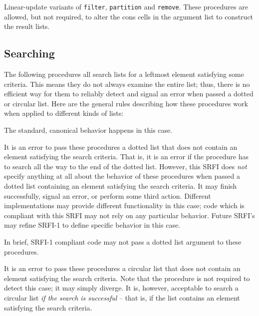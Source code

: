 \begin{entry}{%
  }

  Linear-update
  variants of \texttt{filter}, \texttt{partition} and
  \texttt{remove}. These procedures are allowed, but not required, to
  alter the cons cells in the argument list to construct the result
  lists.
\end{entry}

\subsection{{Searching}}\label{Searching}


The following procedures all search lists for a leftmost element
satisfying some criteria. This means they do not always examine the
entire list; thus, there is no efficient way for them to reliably detect
and signal an error when passed a dotted or circular list. Here are the
general rules describing how these procedures work when applied to
different kinds of lists:

\begin{description}
\tightlist
\item[ Proper lists: ]
The standard, canonical behavior happens in this case.
\item[ Dotted lists: ]
It is an error to pass these procedures a dotted list that does not
contain an element satisfying the search criteria. That is, it is an
error if the procedure has to search all the way to the end of the
dotted list. However, this SRFI does \emph{not} specify anything at all
about the behavior of these procedures when passed a dotted list
containing an element satisfying the search criteria. It may finish
successfully, signal an error, or perform some third action. Different
implementations may provide different functionality in this case; code
which is compliant with this SRFI may not rely on any particular
behavior. Future SRFI's may refine SRFI-1 to define specific behavior in
this case.

In brief, SRFI-1 compliant code may not pass a dotted list argument to
these procedures.
\item[ Circular lists: ]
It is an error to pass these procedures a circular list that does not
contain an element satisfying the search criteria. Note that the
procedure is not required to detect this case; it may simply diverge. It
is, however, acceptable to search a circular list \emph{if the search is
successful} -- that is, if the list contains an element satisfying the
search criteria.
\end{description}


